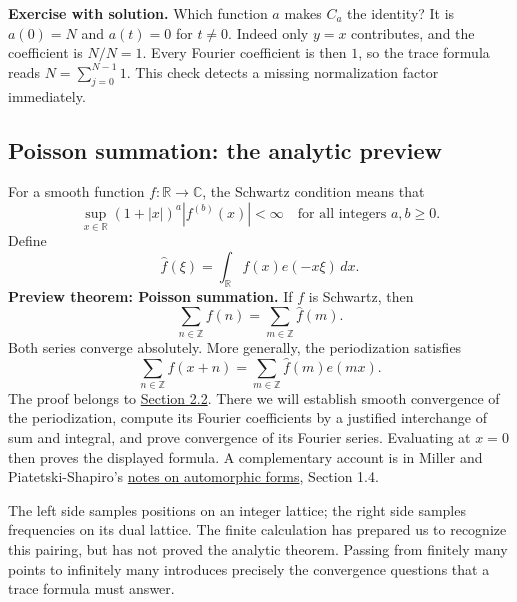 \textbf{Exercise with solution.} Which function \(a\) makes \(C_a\) the identity? It is \(a(0)=N\) and \(a(t)=0\) for \(t\ne0\). Indeed only \(y=x\) contributes, and the coefficient is \(N/N=1\). Every Fourier coefficient is then \(1\), so the trace formula reads \(N=\sum_{j=0}^{N-1}1\). This check detects a missing normalization factor immediately.

\subsection{Poisson summation: the analytic preview}\label{poisson-preview}

For a smooth function \(f:\mathbb R\to\mathbb C\), the Schwartz condition means that
\[
\sup_{x\in\mathbb R}(1+|x|)^a|f^{(b)}(x)|<\infty
\quad\text{for all integers }a,b\geq0.
\]
Define
\[
\widehat f(\xi)=\int_{\mathbb R}f(x)e(-x\xi)\,dx.
\]
\textbf{Preview theorem: Poisson summation.} If \(f\) is Schwartz, then
\[
\sum_{n\in\mathbb Z}f(n)=\sum_{m\in\mathbb Z}\widehat f(m).
\]
Both series converge absolutely. More generally, the periodization satisfies
\[
\sum_{n\in\mathbb Z}f(x+n)
=\sum_{m\in\mathbb Z}\widehat f(m)e(mx).
\]
The proof belongs to \hyperref[v1a-ch02-s2]{Section 2.2}. There we will establish smooth convergence of the periodization, compute its Fourier coefficients by a justified interchange of sum and integral, and prove convergence of its Fourier series. Evaluating at \(x=0\) then proves the displayed formula. A complementary account is in Miller and Piatetski-Shapiro's \href{https://sites.math.rutgers.edu/~sdmiller/480a/crashcourse.pdf}{notes on automorphic forms}, Section 1.4.

The left side samples positions on an integer lattice; the right side samples frequencies on its dual lattice. The finite calculation has prepared us to recognize this pairing, but has not proved the analytic theorem. Passing from finitely many points to infinitely many introduces precisely the convergence questions that a trace formula must answer.
